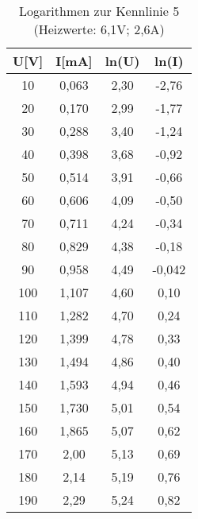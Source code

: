 \begin{table}[h]
	\begin{center}
		\begin{tabular}{cccc}
			U[V] & I[mA] & ln(U) & ln(I)\\ \hline
			10	&0,063& 2,30& -2,76\\                  
			20	&0,170& 2,99& -1,77\\
			30	&0,288& 3,40& -1,24\\
			40	&0,398& 3,68& -0,92\\
			50	&0,514& 3,91& -0,66\\
			60	&0,606& 4,09& -0,50\\
			70	&0,711& 4,24& -0,34\\
			80	&0,829& 4,38& -0,18\\
			90	&0,958& 4,49& -0,042\\
			100	&1,107& 4,60& 0,10\\
			110	&1,282& 4,70& 0,24\\
			120	&1,399& 4,78& 0,33\\
			130	&1,494& 4,86& 0,40\\
			140	&1,593& 4,94& 0,46\\
			150	&1,730& 5,01& 0,54\\
			160	&1,865& 5,07& 0,62\\
			170	&2,00& 5,13& 0,69\\
			180	&2,14& 5,19& 0,76\\
			190	&2,29& 5,24& 0,82\\
		\end{tabular}
		\caption{Logarithmen zur Kennlinie 5 (Heizwerte: 6,1V; 2,6A)}
		\label{tabblinreg}
	\end{center}
\end{table}